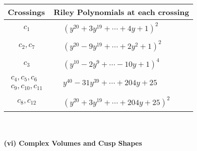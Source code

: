 \documentclass[1p]{elsarticle_modified}
\theoremstyle{definition}
\begin{document}
\begin{tabular}{m{50pt}|m{274pt}}
Crossings & \hspace{64pt}Riley Polynomials at each crossing \\
\hline $$\begin{aligned}c_{1}\end{aligned}$$&$\begin{aligned}
&(y^{20}+3 y^{19}+\cdots+4 y+1)^{2}
\end{aligned}$\\
\hline $$\begin{aligned}c_{2},c_{7}\end{aligned}$$&$\begin{aligned}
&(y^{20}-9 y^{19}+\cdots+2 y^2+1)^{2}
\end{aligned}$\\
\hline $$\begin{aligned}c_{3}\end{aligned}$$&$\begin{aligned}
&(y^{10}-2 y^9+\cdots-10 y+1)^{4}
\end{aligned}$\\
\hline $$\begin{aligned}c_{4},c_{5},c_{6}\\c_{9},c_{10},c_{11}\end{aligned}$$&$\begin{aligned}
&y^{40}-31 y^{39}+\cdots+204 y+25
\end{aligned}$\\
\hline $$\begin{aligned}c_{8},c_{12}\end{aligned}$$&$\begin{aligned}
&(y^{20}+3 y^{19}+\cdots+204 y+25)^{2}
\end{aligned}$\\
\hline
\end{tabular}\\~\\
\newpage\flushleft \textbf{(vi) Complex Volumes and Cusp Shapes}
\end{document}
